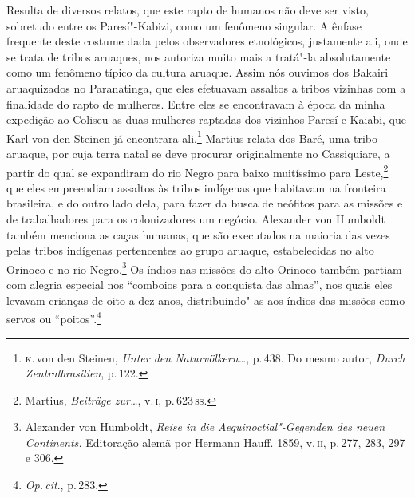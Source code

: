 Resulta de diversos relatos, que este rapto de humanos não deve ser
visto, sobretudo entre os Paresí"-Kabizi, como um fenômeno singular. A
ênfase frequente deste costume dada pelos observadores etnológicos,
justamente ali, onde se trata de tribos aruaques, nos autoriza muito mais
a tratá"-la absolutamente como um fenômeno típico da cultura aruaque.
Assim nós ouvimos dos Bakairi aruaquizados no Paranatinga, que eles
efetuavam assaltos a tribos vizinhas com a finalidade do rapto de
mulheres. Entre eles se encontravam à época da minha expedição ao
Coliseu as duas mulheres raptadas dos vizinhos Paresí e Kaiabi, que Karl
von den Steinen já encontrara ali.\footnote{\textsc{k}.\,von den Steinen,
  \textit{Unter den Naturvölkern\ldots}, p.\,438. Do mesmo
  autor, \textit{Durch Zentralbrasilien}, p.\,122.} Martius relata dos
Baré, uma tribo aruaque, por cuja terra natal se deve procurar
originalmente no Cassiquiare, a partir do qual se expandiram do rio
Negro para baixo muitíssimo para Leste,\footnote{Martius, \textit{Beiträge
  zur\ldots}, v.\,\textsc{i},
  p.\,623\,\textsc{ss}.} que eles empreendiam assaltos às tribos indígenas que
habitavam na fronteira brasileira, e do outro lado dela, para fazer da
busca de neófitos para as missões e de trabalhadores para os
colonizadores um negócio. Alexander von Humboldt também menciona as
caças humanas, que são executados na maioria das vezes pelas tribos
indígenas pertencentes ao grupo aruaque, estabelecidas no alto Orinoco e
no rio Negro.\footnote{Alexander von Humboldt, \textit{Reise in die
  Aequinoctial"-Gegenden des neuen Continents.} Editoração alemã por
  Hermann Hauff. 1859, v.\,\textsc{ii}, p.\,277, 283, 297 e 306.} Os índios nas
missões do alto Orinoco também partiam com alegria especial nos
``comboios para a conquista das almas'', nos quais eles levavam
crianças de oito a dez anos, distribuindo"-as aos índios das missões como
servos ou ``poitos''.\footnote{\textit{Op.\,cit}., p.\,283.}

